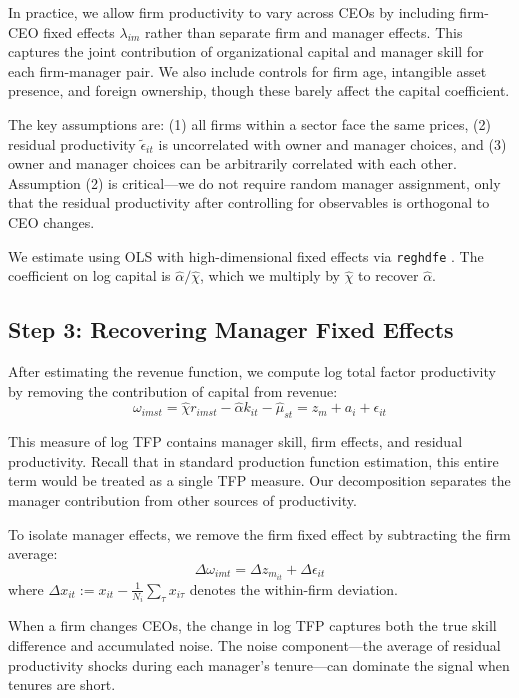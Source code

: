 \documentclass[11pt,a4paper]{article}
\begin{document}
In practice, we allow firm productivity to vary across CEOs by including firm-CEO fixed effects $\lambda_{im}$ rather than separate firm and manager effects. This captures the joint contribution of organizational capital and manager skill for each firm-manager pair. We also include controls for firm age, intangible asset presence, and foreign ownership, though these barely affect the capital coefficient.

The key assumptions are: (1) all firms within a sector face the same prices, (2) residual productivity $\tilde{\epsilon}_{it}$ is uncorrelated with owner and manager choices, and (3) owner and manager choices can be arbitrarily correlated with each other. Assumption (2) is critical—we do not require random manager assignment, only that the residual productivity after controlling for observables is orthogonal to CEO changes.

We estimate using OLS with high-dimensional fixed effects via \texttt{reghdfe} \citep{reghdfe}. The coefficient on log capital is $\hat{\alpha}/\hat{\chi}$, which we multiply by $\hat{\chi}$ to recover $\hat{\alpha}$.

\subsection{Step 3: Recovering Manager Fixed Effects}

After estimating the revenue function, we compute log total factor productivity by removing the contribution of capital from revenue:
\begin{equation}
\omega_{imst} = \hat{\chi} r_{imst} - \hat{\alpha} k_{it} - \hat{\mu}_{st} = z_m + a_i + \epsilon_{it}
\end{equation}

This measure of log TFP contains manager skill, firm effects, and residual productivity. Recall that in standard production function estimation, this entire term would be treated as a single TFP measure. Our decomposition separates the manager contribution from other sources of productivity.

To isolate manager effects, we remove the firm fixed effect by subtracting the firm average:
\begin{equation}
\Delta\omega_{imt} = \Delta z_{m_{it}} + \Delta\epsilon_{it}
\end{equation}
where $\Delta x_{it} := x_{it} - \frac{1}{N_i}\sum_{\tau} x_{i\tau}$ denotes the within-firm deviation.

When a firm changes CEOs, the change in log TFP captures both the true skill difference and accumulated noise. The noise component—the average of residual productivity shocks during each manager's tenure—can dominate the signal when tenures are short.
\end{document}
